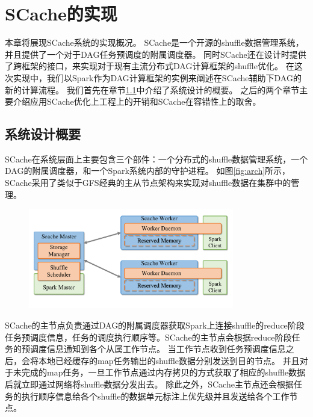
\chapter{SCache的实现}
\label{chap:impl}

本章将展现SCache系统的实现概况。
SCache是一个开源的shuffle数据管理系统，并且提供了一个对于DAG任务预调度的附属调度器。
同时SCache还在设计时提供了跨框架的接口，来实现对于现有主流分布式DAG计算框架的shuffle优化。
在这次实现中，我们以Spark作为DAG计算框架的实例来阐述在SCache辅助下DAG的新的计算流程。
我们首先在章节\ref{sec:overview}中介绍了系统设计的概要。
之后的两个章节主要介绍应用SCache优化上工程上的开销和SCache在容错性上的取舍。

\section{系统设计概要}
\label{sec:overview}

SCache在系统层面上主要包含三个部件：一个分布式的shuffle数据管理系统，一个DAG的附属调度器，和一个Spark系统内部的守护进程。
如图\ref{fig:arch}所示，SCache采用了类似于GFS\cite{gfs}经典的主从节点架构来实现对shuffle数据在集群中的管理。

\begin{figure}[!htp]
	\centering
	\includegraphics[width=0.8\textwidth]{../../PPoPP-2018/fig/arch.pdf}
\end{figure}

SCache的主节点负责通过DAG的附属调度器获取Spark上连接shuffle的reduce阶段任务预调度信息，任务的调度执行顺序等。SCache的主节点会根据reduce阶段任务的预调度信息通知到各个从属工作节点。
当工作节点收到任务预调度信息之后，会将本地已经缓存的map任务输出的shuffle数据分别发送到目的节点。
并且对于未完成的map任务，一旦工作节点通过内存拷贝的方式获取了相应的shuffle数据后就立即通过网络将shuffle数据分发出去。
除此之外，SCache主节点还会根据任务的执行顺序信息给各个shuffle的数据单元标注上优先级并且发送给各个工作节点。

